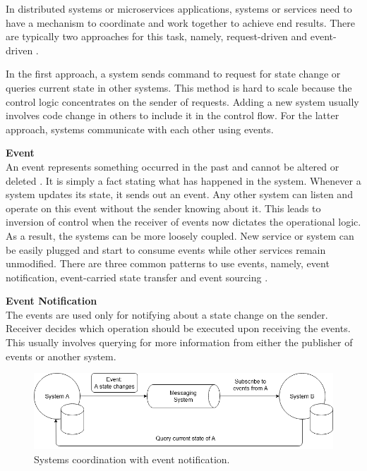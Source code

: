 
In distributed systems or microservices applications, systems or services need to have a mechanism to coordinate and work together to achieve end results. There are typically two approaches for this task, namely, request-driven and event-driven \cite{stopford2018designingeventdriven}.

In the first approach, a system sends command to request for state change or queries current state in other systems. This method is hard to scale because the control logic concentrates on the sender of requests. Adding a new system usually involves code change in others to include it in the control flow. For the latter approach, systems communicate with each other using events.

\textbf{Event}\\
An event represents something occurred in the past and cannot be altered or deleted \cite{cqrsgregyoung}. It is simply a fact stating what has happened in the system. Whenever a system updates its state, it sends out an event. Any other system can listen and operate on this event without the sender knowing about it. This leads to inversion of control when the receiver of events now dictates the operational logic. As a result, the systems can be more loosely coupled. New service or system can be easily plugged and start to consume events while other services remain unmodified. There are three common patterns to use events, namely, event notification, event-carried state transfer and event sourcing \cite{martinfowlereventdriven}.

\textbf{Event Notification}\\
The events are used only for notifying about a state change on the sender. Receiver decides which operation should be executed upon receiving the events. This usually involves querying for more information from either the publisher of events or another system.   
\begin{figure}[h]
	\centering
	\includegraphics[width=\linewidth]{images/eventnotification.png}
	\caption{Systems coordination with event notification.}
	\label{fig:eventnotification}
\end{figure}

